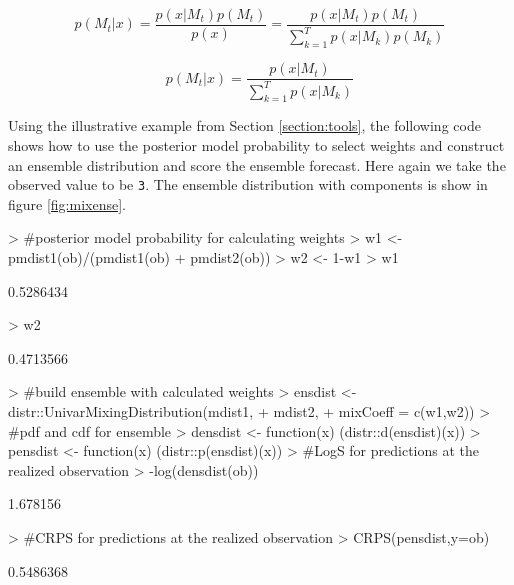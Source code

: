 \documentclass[11pt,notitlepage]{isuthesis}
\begin{document}
\begin{equation}
\label{eq:pmp}
p(M_t|x) = \frac{p(x|M_t)p(M_t)}{p(x)}
         = \frac{p(x|M_t)p(M_t)}{\sum_{k=1}^T p(x|M_k)p(M_k)}
\end{equation}


\begin{equation}
\label{eq:pmpeq}
p(M_t|x) =  \frac{p(x|M_t)}{\sum_{k=1}^Tp(x|M_k)}
\end{equation}



Using the illustrative example from Section \ref{section:tools}, 
the following code shows how
to use the posterior model probability to select weights and construct an 
ensemble distribution and score the ensemble forecast. Here again we take the 
observed value to be \texttt{3}.
The ensemble distribution
with components is show in figure \ref{fig:mixense}.

\begin{Schunk}
\begin{Sinput}
> #posterior model probability for calculating weights
> w1 <- pmdist1(ob)/(pmdist1(ob) + pmdist2(ob))
> w2 <- 1-w1
> w1
\end{Sinput}
\begin{Soutput}
[1] 0.5286434
\end{Soutput}
\begin{Sinput}
> w2
\end{Sinput}
\begin{Soutput}
[1] 0.4713566
\end{Soutput}
\begin{Sinput}
> #build ensemble with calculated weights
> ensdist <- distr::UnivarMixingDistribution(mdist1,
+                                            mdist2,
+                                            mixCoeff = c(w1,w2))
> #pdf and cdf for ensemble
> densdist <- function(x) {(distr::d(ensdist)(x))}
> pensdist <- function(x) {(distr::p(ensdist)(x))}
> #LogS for predictions at the realized observation
> -log(densdist(ob))
\end{Sinput}
\begin{Soutput}
[1] 1.678156
\end{Soutput}
\begin{Sinput}
> #CRPS for predictions at the realized observation
> CRPS(pensdist,y=ob)
\end{Sinput}
\begin{Soutput}
[1] 0.5486368
\end{Soutput}
\end{Schunk}
\end{document}
